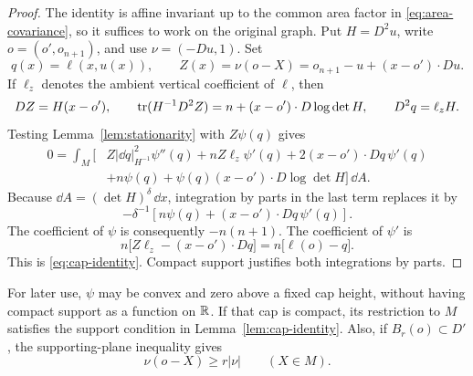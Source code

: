 \begin{proof}
The identity is affine invariant up to the common area factor in
\eqref{eq:area-covariance}, so it suffices to work on the original
graph. Put \(H=D^2u\), write \(o=(o',o_{n+1})\), and use
\(\nu=(-Du,1)\). Set
\[
 q(x)=\ell(x,u(x)),\qquad
 Z(x)=\nu(o-X)=o_{n+1}-u+(x-o')\cdot Du.
\]
If \(\ell_z\) denotes the ambient vertical coefficient of \(\ell\),
then
\[
 DZ=H(x-o'),\qquad
 \operatorname{tr}(H^{-1}D^2Z)=n+(x-o')\cdot D\log\det H,\qquad
 D^2q=\ell_z H.
\]
Testing Lemma~\ref{lem:stationarity} with \(Z\psi(q)\) gives
\begin{align*}
0=\int_M\bigl[
 &Z|\dd q|_{H^{-1}}^2\psi''(q)
 +nZ\ell_z\psi'(q)
 +2(x-o')\cdot Dq\,\psi'(q)\\
 &+n\psi(q)
 +\psi(q)(x-o')\cdot D\log\det H
\bigr]\,\dd A .
\end{align*}
Because \(\dd A=(\det H)^\delta\,\dd x\), integration by parts in the
last term replaces it by
\[
 -\delta^{-1}
 \left[n\psi(q)+(x-o')\cdot Dq\,\psi'(q)\right].
\]
The coefficient of \(\psi\) is consequently \(-n(n+1)\).
The coefficient of \(\psi'\) is
\[
 n\bigl[Z\ell_z-(x-o')\cdot Dq\bigr]
 =n\bigl[\ell(o)-q\bigr].
\]
This is \eqref{eq:cap-identity}. Compact support justifies both
integrations by parts.
\end{proof}

\begin{remark}\label{rem:cap-tests}
For later use, \(\psi\) may be convex and zero above a fixed cap
height, without having compact support as a function on \(\mathbb R\).
If that cap is compact, its restriction to \(M\) satisfies the support
condition in Lemma~\ref{lem:cap-identity}. Also, if
\(B_r(o)\subset D'\), the supporting-plane inequality gives
\begin{equation}\label{eq:interior-support}
 \nu(o-X)\ge r|\nu|\qquad(X\in M).
\end{equation}
\end{remark}
